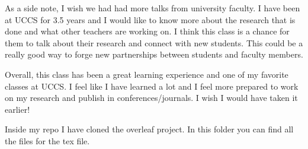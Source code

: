 \documentclass{article}
\begin{document}
As a side note, I wish we had had more talks from university faculty. I have been at UCCS for 3.5 years and I would like to know more about the research that is done and what other teachers are working on. I think this class is a chance for them to talk about their research and connect with new students. This could be a really good way to forge new partnerships between students and faculty members. 

Overall, this class has been a great learning experience and one of my favorite classes at UCCS. I feel like I have learned a lot and I feel more prepared to work on my research and publish in conferences/journals. I wish I would have taken it earlier! 

Inside my repo I have cloned the overleaf project. In this folder you can find all the files for the tex file.
\end{document}
